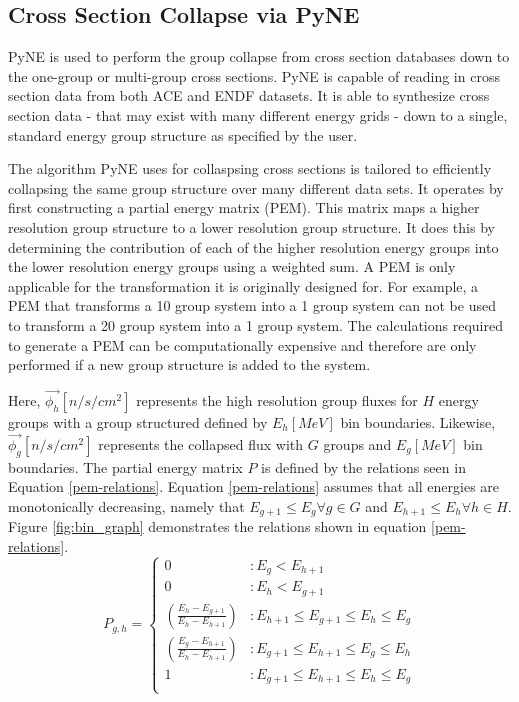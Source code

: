 \documentclass{article}
\begin{document}
\subsection{Cross Section Collapse via PyNE}

PyNE is used to perform the group collapse
from cross section databases down to the one-group or multi-group cross sections.
PyNE is capable of reading in cross section data from both ACE\cite{ace} and ENDF\cite{endf}
datasets. It is able to synthesize cross section data - that may exist with
many different energy grids - down to a single, standard energy group structure as specified
by the user.

The algorithm PyNE uses for collaspsing cross sections is tailored to efficiently collapsing
the same group structure over many different data sets.
It operates by first constructing a partial energy matrix (PEM). This matrix maps a higher
resolution group structure to a lower resolution group structure. It does this by determining
the contribution of each of the higher resolution energy groups into the lower resolution
energy groups using a weighted sum. A PEM is only applicable for the transformation it is
originally designed for. For example, a PEM that transforms a 10 group system into a
1 group system can not be used to transform a 20 group system into a 1 group system.
The calculations required to generate a PEM can be computationally expensive
and therefore are only performed if a new group structure is added to the system.

Here, $\vec{\phi_h}[n/s/cm^2]$ represents the high resolution group fluxes for $H$ energy groups with
a group structured defined by $E_h[MeV]$ bin boundaries. Likewise, $\vec{\phi_g}[n/s/cm^2]$ represents
the collapsed flux with $G$ groups and $E_g[MeV]$ bin boundaries. The partial energy
matrix $P$ is defined by the relations seen in Equation \ref{pem-relations}.
Equation \ref{pem-relations} assumes that all energies are monotonically decreasing, namely
that $E_{g+1} \le E_{g} \forall g\in G$ and $E_{h+1} \le E_{h} \forall h\in H$. Figure \ref{fig:bin_graph}
demonstrates the relations shown in equation \ref{pem-relations}.
\begin{equation}
\label{pem-relations}
P_{g,h} = \left\{
\begin{array}{ll}
    0 & : E_{g} < E_{h+1} \\
    0 & : E_{h} < E_{g+1} \\
    \left(\frac{E_h - E_{g+1}}{E_h - E_{h+1}}\right) & : E_{h+1} \le E_{g+1} \le E_{h} \le E_{g}\\
    \left(\frac{E_{g} - E_{h+1}}{E_h - E_{h+1}}\right) & : E_{g+1} \le E_{h+1} \le E_{g} \le E_{h} \\
    1 & : E_{g+1} \le E_{h+1} \le E_{h} \le E_{g} \\
\end{array}
\right.
\end{equation}
\end{document}
